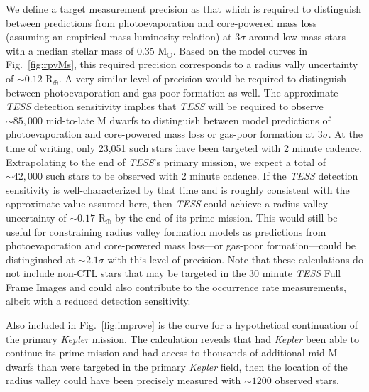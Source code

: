 \documentclass[twocolumn]{emulateapj}
\newcommand{\kepler}[1]{\emph{Kepler}#1}
\newcommand{\tess}[1]{\emph{TESS}#1}
\begin{document}
We define a target measurement precision as that which is required to distinguish between predictions from photoevaporation
and core-powered mass loss (assuming an empirical mass-luminosity relation) at $3\sigma$ around low mass stars with a median
stellar mass of 0.35 M$_{\odot}$. Based on the model curves in Fig.~\ref{fig:rpvMs},
this required precision corresponds to a radius vally uncertainty of $\sim 0.12$ R$_{\oplus}$. A very similar level
of precision would be required to distinguish between photoevaporation and gas-poor formation as well.
The approximate \tess{} detection sensitivity implies that \tess{} will be required to observe $\sim 85,000$ mid-to-late M dwarfs
to distinguish between model predictions of photoevaporation and core-powered mass loss or gas-poor formation at $3\sigma$.
At the time of writing, only 23,051 such stars have been targeted with 2 minute cadence. Extrapolating to the end of \tess{'s}
primary mission, we expect a total of $\sim 42,000$ such stars to be observed with 2 minute cadence. If the \tess{} detection
sensitivity is well-characterized by that time and is roughly consistent with the approximate value assumed here, then \tess{}
could achieve a radius valley uncertainty of $\sim 0.17$ R$_{\oplus}$ by the end of its prime mission.
This would still be useful for constraining radius valley formation models as predictions from photoevaporation and
core-powered mass loss---or gas-poor formation---could be distingiushed at $\sim 2.1\sigma$ with this level of precision.
Note that these calculations do not include non-CTL stars that may be targeted in the 30 minute \tess{} Full Frame Images
and could also contribute to the occurrence rate measurements, albeit with a reduced detection sensitivity.

Also included in Fig.~\ref{fig:improve} is the curve for a hypothetical continuation of the primary \kepler{} mission.
The calculation reveals that had \kepler{} been able to continue its prime mission and had
access to thousands of additional mid-M dwarfs than were targeted in the primary \kepler{} field, then the location
of the radius valley could have been precisely measured with $\sim 1200$ observed stars.
\end{document}
